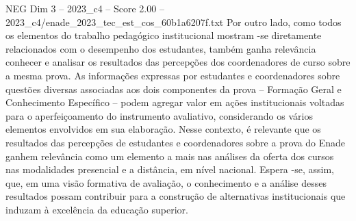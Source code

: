 \begin{textsample}{NEG Dim 3 – 2023\_c4 – Score 2.00 – 2023\_c4/enade\_2023\_tec\_est\_cos\_60b1a6207f.txt}
Por outro lado, como todos os elementos do trabalho pedagógico institucional mostram -se diretamente relacionados com o desempenho dos estudantes, também ganha relevância conhecer e analisar os resultados das percepções dos coordenadores de curso sobre a mesma prova.
As informações expressas por estudantes e coordenadores sobre questões diversas associadas aos dois componentes da prova – Formação Geral e Conhecimento Específico – podem agregar valor em ações institucionais voltadas para o aperfeiçoamento do instrumento avaliativo, considerando os vários elementos envolvidos em sua elaboração.
Nesse contexto, é relevante que os resultados das percepções de estudantes e coordenadores sobre a prova do Enade ganhem relevância como um elemento a mais nas análises da oferta dos cursos nas modalidades presencial e a distância, em nível nacional.
Espera -se, assim, que, em uma visão formativa de avaliação, o conhecimento e a análise desses resultados possam contribuir para a construção de alternativas institucionais que induzam à excelência da educação superior.

\end{textsample}
